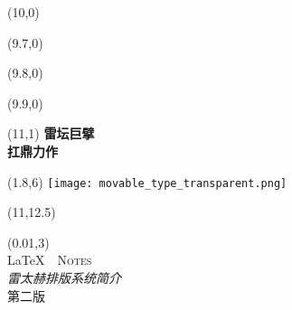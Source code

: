 \begin{titlepage}

\setlength\parindent{0pt}


\begin{textblock}{6}(10,0)
    \rule{0mm}{420mm}
\end{textblock}

\begin{textblock}{.02}(9.7,0)
    \rule{0mm}{420mm}
\end{textblock}

\begin{textblock}{.02}(9.8,0)
    \rule{0mm}{420mm}
\end{textblock}

\begin{textblock}{.02}(9.9,0)
    \rule{0mm}{420mm}
\end{textblock}

\begin{textblock}{3}(11,1)
    {\Huge \textbf{雷坛巨擘}\\[5pt] \textbf{扛鼎力作}}
\end{textblock}

\begin{textblock}{12}(1.8,6)
\textblockcolour{}
    \texttt{[image: movable\_type\_transparent.png]}
\end{textblock}

\begin{textblock}{4}(11,12.5)
    {\huge \textit{\lnotesauthor}}\\[5pt]
    {\Large \lnotesdate}
\end{textblock}

\TPshowboxestrue
\setlength\TPboxrulesize{0.8pt}

\begin{textblock}{14}(0.01,3)
    \centering
    ~\\[20pt]
    {\fontsize{32}{40}\selectfont \LaTeX\ \ \textsc{Notes}}\\[8pt]
    {\huge \textit{雷太赫排版系统简介}}\\[8pt]
    第二版\ \ \lnotesversion\\[20pt]
\end{textblock}
~
\end{titlepage}

\newpage
\thispagestyle{empty}
~

